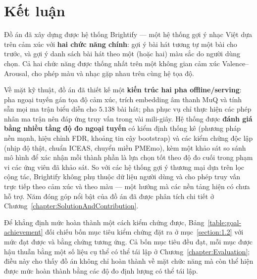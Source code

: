 \documentclass[../DoAn.tex]{subfiles}
\begin{document}
\section{Kết luận}
Đồ án đã xây dựng được hệ thống Brightify --- một hệ thống gợi ý nhạc Việt dựa trên cảm xúc với \textbf{hai chức năng chính}: gợi ý bài hát tương tự một bài cho trước, và gợi ý danh sách bài hát theo một (hoặc hai) màu sắc do người dùng chọn. Cả hai chức năng được thống nhất trên một không gian cảm xúc Valence--Arousal, cho phép màu và nhạc gặp nhau trên cùng hệ tọa độ.

Về mặt kỹ thuật, đồ án đã thiết kế một \textbf{kiến trúc hai pha offline/serving}: pha ngoại tuyến gán tọa độ cảm xúc, trích embedding âm thanh MuQ và tính sẵn mọi ma trận biểu diễn cho $5.138$ bài hát; pha phục vụ chỉ thực hiện các phép nhân ma trận nên đáp ứng truy vấn trong vài mili-giây. Hệ thống được \textbf{đánh giá bằng nhiều tầng độ đo ngoại tuyến} có kiểm định thống kê (phương pháp nền mạnh, hiệu chỉnh FDR, khoảng tin cậy bootstrap) và các kiểm chứng độc lập (nhịp độ thật, chuẩn ICEAS, chuyển miền PMEmo), kèm một khảo sát so sánh mô hình để xác nhận mỗi thành phần là lựa chọn tốt theo độ đo cuối trong phạm vi các ứng viên đã khảo sát. So với các hệ thống gợi ý thương mại dựa trên lọc cộng tác, Brightify không phụ thuộc dữ liệu người dùng và cho phép truy vấn trực tiếp theo cảm xúc và theo màu --- một hướng mà các nền tảng hiện có chưa hỗ trợ. Năm đóng góp nổi bật của đồ án đã được phân tích chi tiết ở Chương~\ref{chapter:SolutionAndContribution}.

Để khẳng định mức hoàn thành một cách kiểm chứng được, Bảng~\ref{table:goal-achievement} đối chiếu bốn mục tiêu kiểm chứng đặt ra ở mục~\ref{section:1.2} với mức đạt được và bằng chứng tương ứng. Cả bốn mục tiêu đều đạt, mỗi mục được hậu thuẫn bằng một số liệu cụ thể có thể tái lập ở Chương~\ref{chapter:Evaluation}; điều này cho thấy đồ án không chỉ hoàn thành về mặt chức năng mà còn thể hiện được mức hoàn thành bằng các độ đo định lượng có thể tái lập.
\end{document}
